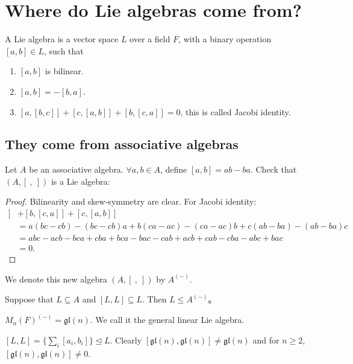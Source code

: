 \documentclass[11pt, a4paper]{report}
\begin{document}
\section{Where do Lie algebras come from?}

\begin{definition} 
A Lie algebra is a vector space $ L $ over a field $ F $, with a binary operation $ [a,b] \in L $, such that
\begin{enumerate}
    \item $ [a,b] $ is bilinear. 
    \item $ [a,b] = -[b,a] $.
    \item $ [a,[b,c]] + [c,[a,b]] + [b,[c,a]] = 0 $, this is called Jacobi identity. 
\end{enumerate}
\end{definition}

\subsection{They come from associative algebras}

Let $ A $ be an associative algebra. $ \forall a,b \in A $, define $ [a,b]=ab-ba $. Check that $ (A,[ \ ,\  ]) $ is a Lie algebra:

\begin{proof}
    Bilinearity and skew-symmetry are clear. For Jacobi identity:
    \begin{align*}
        [a,[b,c]] & + [b,[c,a]] + [c,[a,b]] \\ 
        &= a(bc-cb) - (bc-cb)a + b(ca-ac) - (ca-ac)b + c(ab-ba) - (ab-ba)c \\
        &= abc - acb - bca + cba + bca - bac - cab + acb + cab - cba - abc + bac \\
        &= 0.
    \end{align*}
\end{proof}

We denote this new algebra $ (A,[ \ ,\  ]) $ by $ A^{(-)} $. 

Suppose that $ L \subseteq A $ and $ [L,L] \subseteq L $. Then $ L \le A^{(-)} $。

\begin{example} 
$ M_n(F)^{(-)}=\mathfrak{gl}(n) $. We call it the general linear Lie algebra.

$ [L,L]=\{ \sum_{i} [a_i,b_i] \} \trianglelefteq L $. Clearly $ [\mathfrak{gl}(n),\mathfrak{gl}(n)] \neq \mathfrak{gl}(n) $ and for $ n \ge 2 $, $ [\mathfrak{gl}(n),\mathfrak{gl}(n)]\neq 0 $.    
\end{example}
\end{document}
